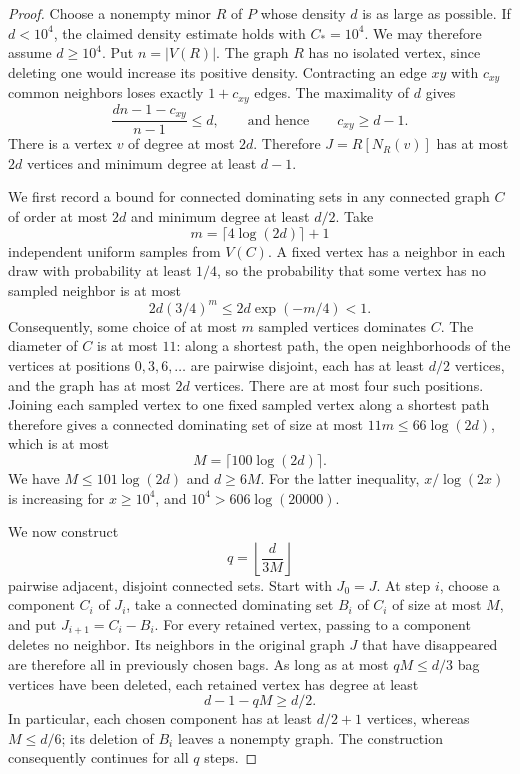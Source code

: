 \begin{proof}
Choose a nonempty minor \(R\) of \(P\) whose density \(d\) is as large as
possible. If \(d<10^4\), the claimed density estimate holds with
\(C_*=10^4\). We may therefore assume \(d\ge10^4\).
Put \(n=|V(R)|\). The graph \(R\) has no isolated vertex, since deleting
one would increase its positive density.
Contracting an edge \(xy\) with \(c_{xy}\) common neighbors
loses exactly \(1+c_{xy}\) edges. The maximality of \(d\) gives
\[
 \frac{dn-1-c_{xy}}{n-1}\le d,
 \qquad\text{and hence}\qquad c_{xy}\ge d-1.
\]
There is a vertex \(v\) of degree at most \(2d\). Therefore
\(J=R[N_R(v)]\) has at most \(2d\) vertices and minimum degree at least \(d-1\).

We first record a bound for connected dominating sets in any connected graph
\(C\) of order at most \(2d\) and minimum degree at least \(d/2\).
Take
\[
 m=\lceil4\log(2d)\rceil+1
\]
independent uniform samples from \(V(C)\). A fixed vertex has a neighbor in
each draw with probability at least \(1/4\), so the probability that some
vertex has no sampled neighbor is at most
\[
 2d(3/4)^m\le 2d\exp(-m/4)<1.
\]
Consequently, some choice of at most \(m\) sampled vertices dominates \(C\).
The diameter of \(C\) is at most \(11\): along a shortest path, the open
neighborhoods of the vertices at positions \(0,3,6,\ldots\) are pairwise
disjoint, each has at least \(d/2\) vertices, and the graph has at most \(2d\)
vertices. There are at most four such positions. Joining each sampled
vertex to one fixed sampled vertex along a shortest path therefore gives
a connected dominating set of size at most
\(11m\le66\log(2d)\), which is at most
\[
 M=\lceil100\log(2d)\rceil.
\]
We have \(M\le101\log(2d)\) and \(d\ge6M\).
For the latter inequality, \(x/\log(2x)\) is increasing for \(x\ge10^4\),
and \(10^4>606\log(20000)\).

We now construct
\[
 q=\left\lfloor\frac{d}{3M}\right\rfloor
\]
pairwise adjacent, disjoint connected sets. Start with \(J_0=J\).
At step \(i\), choose a component \(C_i\) of \(J_i\), take a connected
dominating set \(B_i\) of \(C_i\) of size at most \(M\), and put
\(J_{i+1}=C_i-B_i\).
For every retained vertex, passing to a component deletes no neighbor.
Its neighbors in the original graph \(J\) that have disappeared are
therefore all in previously chosen bags. As long as at most \(qM\le d/3\)
bag vertices have been deleted, each retained vertex has degree at least
\[
 d-1-qM\ge d/2.
\]
In particular, each chosen component has at least \(d/2+1\) vertices,
whereas \(M\le d/6\); its deletion of \(B_i\) leaves a nonempty graph.
The construction consequently continues for all \(q\) steps.


\end{proof}
